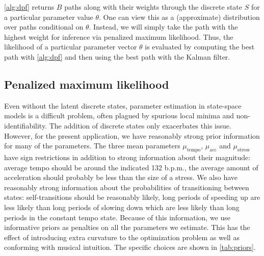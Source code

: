 \documentclass[12pt]{article}
\begin{document}
\autoref{alg:dpf} returns $B$ paths along with their weights through
the discrete state $S$ for a 
particular parameter value $\theta$. One
can view this as a (approximate) distribution over paths conditional
on $\theta$. Instead, we will simply take the path with the highest
weight for inference via penalized maximum likelihood. Thus, the
likelihood of a particular parameter vector $\theta$ is evaluated by
computing the best path with \autoref{alg:dpf} and then using the best
path with the Kalman filter.%

\subsection{Penalized maximum likelihood}
\label{sec:penal-maxim-likel}

Even without the latent discrete states, parameter estimation in
state-space models is a difficult problem, often plagued by spurious
local minima and non-identifiability. The addition of discrete states
only exacerbates this issue. However, for the present application, we
have reasonably strong prior information for many of the
parameters. The three mean parameters $\mu_{\textrm{tempo}}$,
$\mu_{\textrm{acc}}$ and $\mu_{\textrm{stress}}$ have sign
restrictions in addition to strong information about their magnitude:
average tempo should be around the indicated 132 b.p.m., the average
amount of acceleration should probably be less than the size of a
stress. We also have reasonably strong information about the
probabilities of transitioning between states: self-transitions should
be reasonably likely, long periods of speeding up are less likely than
long periods of slowing down which are less likely than long periods
in the constant tempo state. Because of this information, we use
informative priors as penalties on all the parameters we
estimate. This has the effect of introducing extra curvature to the
optimization problem as well as conforming with musical intuition. The
specific choices are shown in \autoref{tab:priors}. 
\end{document}
